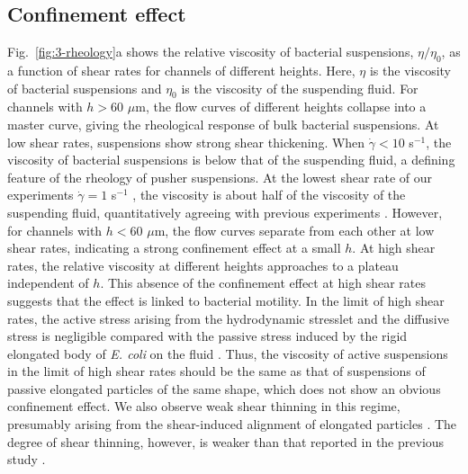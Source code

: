 \subsection{Confinement effect}
Fig.~\ref{fig:3-rheology}a shows the relative viscosity of bacterial suspensions, $\eta/\eta_0$, as a function of shear rates for channels of different heights. Here, $\eta$ is the viscosity of bacterial suspensions and $\eta_0$ is the viscosity of the suspending fluid. For channels with $h > 60$ $\mu$m, the flow curves of different heights collapse into a master curve, giving the rheological response of bulk bacterial suspensions. At low shear rates, suspensions show strong shear thickening. When $\dot\gamma < 10$ s$^{-1}$, the viscosity of bacterial suspensions is below that of the suspending fluid, a defining feature of the rheology of pusher suspensions. At the lowest
shear rate of our experiments $\dot\gamma=1$ s$^{-1}$ , the viscosity is about half of the viscosity of the suspending fluid, quantitatively agreeing with previous experiments \cite{Gachelin2013}. However, for channels with $h < 60$ $\mu$m, the flow curves separate from each other at low shear rates, indicating a strong confinement effect at a small $h$. At high shear rates, the relative viscosity at different heights approaches to a plateau independent of $h$. This absence of the confinement effect at high shear rates suggests that the effect is linked to bacterial motility. In the limit of high shear rates, the active stress arising from the hydrodynamic stresslet and the diffusive stress is negligible compared with the passive stress induced by the rigid elongated body of \textit{E. coli} on the fluid \cite{Takatori2017, Saintillan2018}. Thus, the viscosity of active suspensions in
the limit of high shear rates should be the same as that of suspensions of passive elongated particles of the same shape, which does not show an obvious confinement effect. We also observe weak shear thinning in this regime, presumably arising from the shear-induced alignment of elongated particles \cite{Egres2006}. The degree of shear thinning, however, is weaker than that reported in the previous study \cite{Gachelin2013}.


